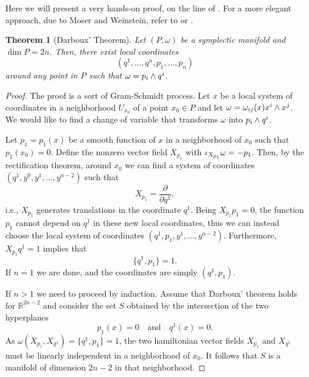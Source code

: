 \documentclass[english,fontsize=11pt,paper=a5,oneside]{scrbook}
\newcommand{\R}{\mathbb{R}}
\let\d\relax
\newcommand{\d}{\mathrm{d}}
\newtheorem{theorem}{Theorem}[chapter]
\theoremstyle{definition}
\begin{document}
Here we will present a very hands-on proof, on the line of \cite[Problem 22-19]{book:lee}. For a more elegant approach, due to Moser and Weinstein, refer to \cite[Chapter 22]{book:lee} or \cite[Chapter 10.3]{book:knauf}.

\begin{theorem}[Darboux' Theorem]
  Let $(P, \omega)$ be a symplectic manifold and $\dim P = 2n$.
  Then, there exist local coordinates
  \begin{equation}
    (q^1, \ldots, q^n, p_1, \ldots, p_n)
  \end{equation} around any point in $P$ such that $\omega = \d p_i \wedge \d q^i$.
\end{theorem}
\begin{proof}
  The proof is a sort of Gram-Schmidt process.
  Let $x$ be a local system of coordinates in a neighborhood $U_{x_0}$ of a point $x_0\in P$ and let $\omega = \omega_{ij}(x)\d x^i\wedge \d x^j$.
  We would like to find a change of variable that transforms $\omega$ into $\d p_i \wedge \d q^i$.

  Let $p_1=p_1(x)$ be a smooth function of $x$ in a neighborhood of $x_0$ such that $p_1(x_0) = 0$.
  Define the nonzero vector field $X_{p_1}$ with $\iota_{X_{p_1}}\omega = -\d p_1$.
  Then, by the rectification theorem, around $x_0$ we can find a system of coordinates $(q^1, y^0, y^1, \ldots, y^{n-2})$ such that
  \begin{equation}
    X_{p_1} = \frac{\partial}{\partial q^1},
  \end{equation}
  i.e., $X_{p_1}$ generates translations in the coordinate $q^1$.
  Being $X_{p_1} p_1 = 0$, the function $p_1$ cannot depend on $q^1$ in these new local coordinates, thus we can instead choose the local system of coordinates $(q^1, p_1, y^1, \ldots, y^{n-2})$.
  Furthermore, $X_{p_1} q^1 = 1$ implies that
  \begin{equation}
    \big\{q^1, p_1\big\} = 1.
  \end{equation}
  If $n=1$ we are done, and the coordinates are simply $(q^1, p_1)$.

  If $n>1$ we need to proceed by induction.
  Assume that Darboux' theorem holds for $\R^{2n-2}$ and consider the set $S$ obtained by the intersection of the two hyperplanes
  \begin{equation}
    p_1(x) = 0 \quad\mbox{and}\quad q^1(x) = 0.
  \end{equation}
  As $\omega(X_{p_1}, X_{q^1}) = \big\{q^1, p_1\big\} = 1$, the two hamiltonian vector fields $X_{p_1}$ and $X_{q^1}$ must be linearly independent in a neighborhood of $x_0$. It follows that $S$ is a manifold of dimension $2n-2$ in that neighborhood.


\end{proof}
\end{document}
